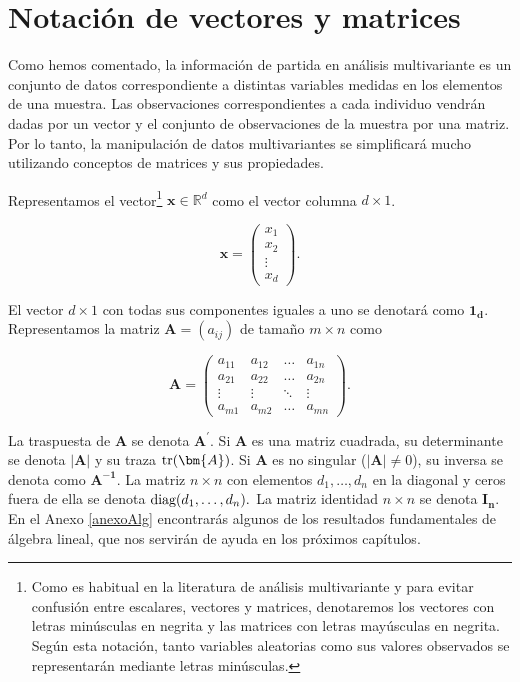 \documentclass[
  a4paper,
  oneside]{scrbook}
\theoremstyle{definition}
\theoremstyle{definition}
\theoremstyle{definition}
\theoremstyle{definition}
\theoremstyle{remark}
\begin{document}
\section{Notación de vectores y matrices}\label{notacion-de-vectores-y-matrices}

Como hemos comentado, la información de partida en análisis multivariante es un conjunto de datos correspondiente a distintas variables medidas en los elementos de una muestra. Las observaciones correspondientes a cada individuo vendrán dadas por un vector y el conjunto de observaciones de la muestra por una matriz. Por lo tanto, la manipulación de datos multivariantes se simplificará mucho utilizando conceptos de matrices y sus propiedades.

Representamos el vector\footnote{Como es habitual en la literatura de análisis multivariante y para evitar confusión entre escalares, vectores y matrices, denotaremos los vectores con letras minúsculas en negrita y las matrices con letras mayúsculas en negrita. Según esta notación, tanto variables aleatorias como sus valores observados se representarán mediante letras minúsculas.} \(\bm{x}\in\mathbb{R}^d\) como el vector columna \(d\times 1\).

\[\bm{x}=\left(\begin{array}{c}x_1\\ x_2\\ \vdots \\ x_d \end{array}\right).\]

El vector \(d\times 1\) con todas sus componentes iguales a uno se
denotará como \(\bm{1_d}\). Representamos la matriz \(\bm{A}=(a_{ij})\) de
tamaño \(m\times n\) como

\[\bm{A}=\left(\begin{array}{cccc}a_{11}&a_{12}&\ldots&a_{1n}\\
a_{21}&a_{22}&\ldots&a_{2n}\\
\vdots&\vdots&\ddots&\vdots\\
a_{m1}&a_{m2}&\ldots&a_{mn}\end{array}\right).\]

La traspuesta de
\(\bm{A}\) se denota \(\bm{A}^\prime{}\). Si \(\bm{A}\) es una matriz
cuadrada, su determinante se denota \(\left|\bm{A}\right|\) y su traza
\(\textnormal{tr}(\bm{A})\). Si \(\bm{A}\) es no singular
(\(\left|\bm{A}\right|\neq 0\)), su inversa se denota como \(\bm{A^{-1}}\).
La matriz \(n\times n\) con elementos \(d_1,\ldots, d_n\) en la diagonal y
ceros fuera de ella se denota \(\textnormal{diag}(d_1,\ldots,d_n).\) La
matriz identidad \(n\times n\) se denota \(\bm{I_n}\). En el Anexo \ref{anexoAlg}
encontrarás algunos de los resultados fundamentales de álgebra lineal,
que nos servirán de ayuda en los próximos capítulos.
\end{document}
